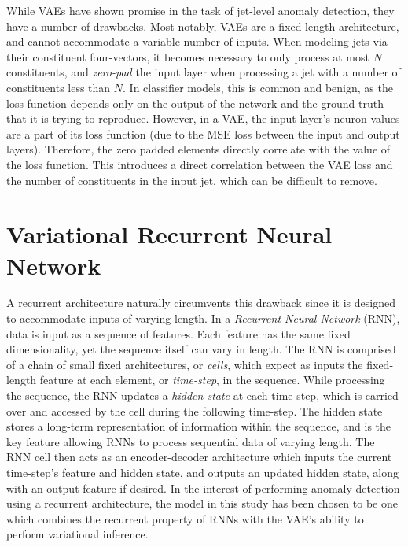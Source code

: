 \documentclass[12pt, a4paper]{article}
\begin{document}
While VAEs have shown promise in the task of jet-level anomaly detection, they have a number of drawbacks. 
Most notably, VAEs are a fixed-length architecture, and cannot accommodate a variable number of inputs. 
When modeling jets via their constituent four-vectors, it becomes necessary to only process at most $N$ constituents, and \textit{zero-pad} the input layer when processing a jet with a number of constituents less than $N$. 
In classifier models, this is common and benign, as the loss function depends only on the output of the network and the ground truth that it is trying to reproduce. 
However, in a VAE, the input layer's neuron values are a part of its loss function (due to the MSE loss between the input and output layers).
Therefore, the zero padded elements directly correlate with the value of the loss function. 
This introduces a direct correlation between the VAE loss and the number of constituents in the input jet, which can be difficult to remove. 



\section{Variational Recurrent Neural Network}

A recurrent architecture naturally circumvents this drawback since it is designed to accommodate inputs of varying length. 
In a \textit{Recurrent Neural Network} (RNN), data is input as a sequence of features. Each feature has the same fixed dimensionality, yet the sequence itself can vary in length. 
The RNN is comprised of a chain of small fixed architectures, or \textit{cells}, which expect as inputs the fixed-length feature at each element, or \textit{time-step}, in the sequence. 
While processing the sequence, the RNN updates a \textit{hidden state} at each time-step, which is carried over and accessed by the cell during the following time-step. 
The hidden state stores a long-term representation of information within the sequence, and is the key feature allowing RNNs to process sequential data of varying length. 
The RNN cell then acts as an encoder-decoder architecture which inputs the current time-step's feature and hidden state, and outputs an updated hidden state, along with an output feature if desired. 
In the interest of performing anomaly detection using a recurrent architecture, the model in this study has been chosen to be one which combines the recurrent property of RNNs with the VAE's ability to perform variational inference. 
\end{document}
